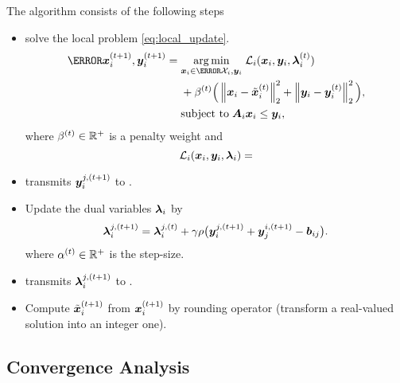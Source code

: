 \documentclass[twocolumn,amsthm]{autart}%
\theoremstyle{definition}
\theoremstyle{plain}
\begin{document}
The algorithm consists of the following steps
\begin{itemize}
\item {} solve the local problem \eqref{eq:local_update}.
\begin{equation}
\label{eq:local_update}
\begin{split}
\bar{\bbsym{x}}_i^{(t+1)}, {\bbsym{y}}_i^{(t+1)} =\; & \underset{\bbsym{x}_i \in \bar{\XXX}_i, \bbsym{y}_i}{\argmin}  \; \LLL_i (\bbsym{x}_i, \bbsym{y}_i, \bbsym{\lambda}_{i}^{(t)}) \\
& + \beta^{(t)} \Big( \norm{\bbsym{x}_i - \tilde{\bbsym{x}}_i^{(t)}}_2^2 + \norm{\bbsym{y}_i - \bbsym{y}_i^{(t)}}_2^2 \Big) , \\
& \text{subject to} \; \bbsym{A}_{i} \bbsym{x}_i \le \bbsym{y}_{i},
\end{split}
\end{equation}
where $\beta^{(t)} \in \mathbb{R}^{+}$ is a penalty weight and 
\begin{equation}
\mathcal{L}_i (\boldsymbol{x}_i, \boldsymbol{y}_i, \boldsymbol{\lambda}_{i}) =    
\end{equation}

\item {} transmits ${\boldsymbol{y}}_i^{j,(t+1)}$ to .
\item Update the dual variables $\boldsymbol{\lambda}_{i}$ by 
\begin{equation}
\boldsymbol{\lambda}_{i}^{j,(t+1)} = \boldsymbol{\lambda}_{i}^{j,(t)} + \gamma \rho \big( \boldsymbol{y}_{i}^{j,(t+1)} + \boldsymbol{y}_{j}^{i,(t+1)} - \boldsymbol{b}_{ij} \big).
\end{equation}
where $\alpha^{(t)} \in \mathbb{R}^{+}$ is the step-size.
\item {} transmits $\boldsymbol{\lambda}_i^{j,(t+1)}$ to .
\item Compute $\tilde{\boldsymbol{x}}_i^{(t+1)}$ from $\boldsymbol{x}_i^{(t+1)}$ by rounding operator (transform a real-valued solution into an integer one).
\end{itemize}



\subsection{Convergence Analysis}
\end{document}
